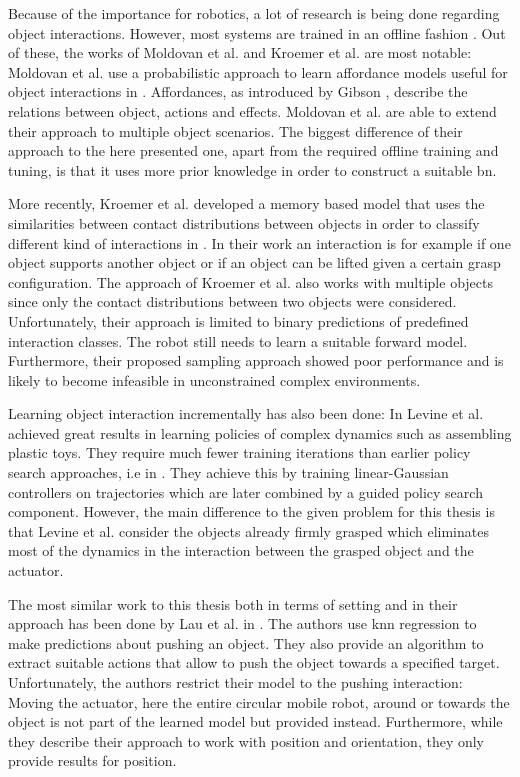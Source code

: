 Because of the importance for robotics, a lot of research is being done regarding object interactions.  However, most systems are trained in an offline fashion \cite{nishide2008predicting, moldovan2012learning, contactPrediction}. Out of these, the works of Moldovan et al. and Kroemer et al. are most notable:
Moldovan et al. use a probabilistic approach to learn affordance models useful for object interactions in \cite{moldovan2012learning}. Affordances, as introduced by Gibson \cite{affordances}, describe the relations between object, actions and effects. Moldovan et al. are able to extend their approach to multiple object scenarios. The biggest difference of their approach to the here presented one, apart from the required offline training and tuning, is that it uses more prior knowledge in order to construct a suitable \gls{bn}.

More recently, Kroemer et al. developed a memory based model that uses the similarities between contact distributions between objects in order to classify different kind of interactions in \cite{contactPrediction}. In their work an interaction is for example if one object supports another object or if an object can be lifted given a certain grasp configuration. The approach of Kroemer et al. also works with multiple objects since only the contact distributions between two objects were considered. Unfortunately, their approach is limited to binary predictions of predefined interaction classes. The robot still needs to learn a suitable forward model. Furthermore, their proposed sampling approach showed poor performance and is likely to become infeasible in unconstrained complex environments.

Learning object interaction incrementally has also been done:
In \cite{levine2015learning} Levine et al. achieved great results in learning policies of complex dynamics %
such as assembling plastic toys. They require much fewer training iterations than earlier policy search approaches, i.e in \cite{otherPolicySearchs}. They achieve this by training linear-Gaussian controllers on trajectories which are later combined by a guided policy search component.
However, the main difference to the given problem for this thesis is that Levine et al. consider the objects already firmly grasped which eliminates most of the dynamics in the interaction between the grasped object and the actuator.

The most similar work to this thesis both in terms of setting and in their approach has been done by 
Lau et al. in \cite{pushing}. The authors use \gls{knn} regression to make predictions about pushing an object. They also provide an algorithm to extract suitable actions that allow to push the object towards a specified target. Unfortunately, the authors restrict their model to the pushing interaction: Moving the actuator, here the entire circular mobile robot, around or towards the object is not part of the learned model but provided instead. Furthermore, while they describe their approach to work with position and orientation, they only provide results for position. 


